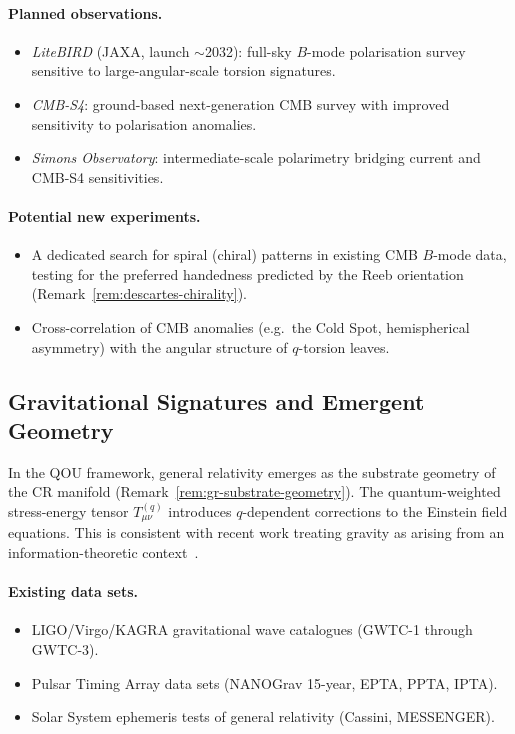 \paragraph{Planned observations.}
\begin{itemize}
  \item \emph{LiteBIRD} (JAXA, launch $\sim$2032): full-sky $B$-mode
        polarisation survey sensitive to large-angular-scale torsion
        signatures.
  \item \emph{CMB-S4}: ground-based next-generation CMB survey with
        improved sensitivity to polarisation anomalies.
  \item \emph{Simons Observatory}: intermediate-scale polarimetry bridging
        current and CMB-S4 sensitivities.
\end{itemize}

\paragraph{Potential new experiments.}
\begin{itemize}
  \item A dedicated search for spiral (chiral) patterns in existing CMB
        $B$-mode data, testing for the preferred handedness predicted by the
        Reeb orientation (Remark~\ref{rem:descartes-chirality}).
  \item Cross-correlation of CMB anomalies (e.g.\ the Cold Spot, hemispherical
        asymmetry) with the angular structure of $q$-torsion leaves.
\end{itemize}

\subsection{Gravitational Signatures and Emergent Geometry}
\label{sec:gravity-emergent}

\begin{remark}
\label{rem:gravity-emergent}
In the QOU framework, general relativity emerges as the substrate geometry of
the CR manifold (Remark~\ref{rem:gr-substrate-geometry}).  The quantum-weighted
stress-energy tensor $T_{\mu\nu}^{(q)}$ introduces $q$-dependent corrections
to the Einstein field equations.  This is consistent with recent work treating
gravity as arising from an information-theoretic context~\cite{carney2025}.
\end{remark}

\paragraph{Existing data sets.}
\begin{itemize}
  \item LIGO/Virgo/KAGRA gravitational wave catalogues (GWTC-1 through
        GWTC-3).
  \item Pulsar Timing Array data sets (NANOGrav 15-year, EPTA, PPTA,
        IPTA).
  \item Solar System ephemeris tests of general relativity (Cassini, MESSENGER).
\end{itemize}

